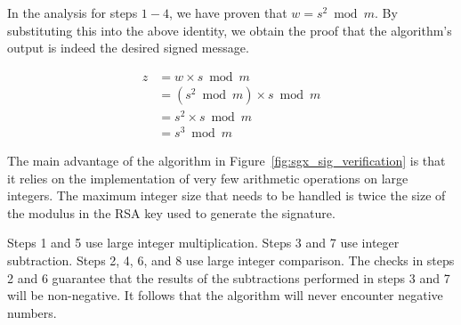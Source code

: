 In the analysis for steps $1 - 4$, we have proven that $w = s ^ 2 \bmod m$. By
substituting this into the above identity, we obtain the proof that the
algorithm's output is indeed the desired signed message.

\begin{align*}
z & = w \times s \bmod m \\
  & = (s^2 \bmod m) \times s \bmod m \\
  & = s^2 \times s \bmod m \\
  & = s^3 \bmod m
\end{align*}



The main advantage of the algorithm in Figure~\ref{fig:sgx_sig_verification} is
that it relies on the implementation of very few arithmetic operations on large
integers. The maximum integer size that needs to be handled is twice the size
of the modulus in the RSA key used to generate the signature.

Steps 1 and 5 use large integer multiplication. Steps 3 and 7 use integer
subtraction. Steps 2, 4, 6, and 8 use large integer comparison. The checks in
steps 2 and 6 guarantee that the results of the subtractions performed in steps
3 and 7 will be non-negative. It follows that the algorithm will never
encounter negative numbers.
